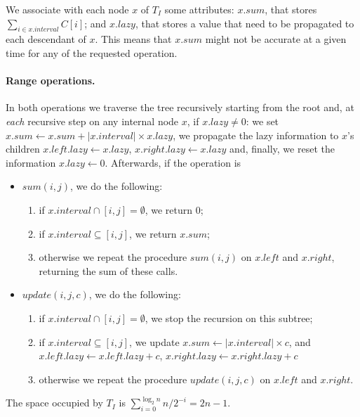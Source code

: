 We associate with each node $x$ of $T_I$ some attributes: $x.sum$, that stores $\sum_{i \in x.interval} C[i]$; and $x.lazy$, that stores a value that need to be propagated to each descendant of $x$. This means that $x.sum$ might not be accurate at a given time for any of the requested operation.  

\paragraph{Range operations.} In both operations we traverse the tree recursively starting from the root and, at \emph{each} recursive step on any internal node $x$, if $x.lazy \neq 0$: we set $x.sum \gets x.sum + |x.interval| \times x.lazy$, we propagate the lazy information to $x$'s children $x.left.lazy \gets x.lazy$, $x.right.lazy \gets x.lazy$ and, finally, we reset the information $x.lazy \gets 0$. Afterwards, if the operation is 
\begin{itemize}
  \item $sum(i,j)$, we do the following:
  \begin{enumerate}
    \item if $x.interval \cap [i,j] = \emptyset$, we return 0;
    \item if $x.interval \subseteq [i,j]$, we return $x.sum$;
    \item otherwise we repeat the procedure $sum(i,j)$ on $x.left$ and $x.right$, returning the sum of these calls.
  \end{enumerate}

  \item $update(i,j,c)$, we do the following:
  \begin{enumerate}
    \item if $x.interval \cap [i,j] = \emptyset$, we stop the recursion on this subtree;
    \item if $x.interval \subseteq [i,j]$, we update $x.sum \gets |x.interval| \times c$, and $x.left.lazy \gets x.left.lazy + c$, $x.right.lazy \gets x.right.lazy + c$
    \item otherwise we repeat the procedure $update(i,j,c)$ on $x.left$ and $x.right$.
  \end{enumerate} 
\end{itemize}
The space occupied by $T_I$ is $\sum_{i=0}^{\log_2 n} n/2^{-i}=2n-1$.